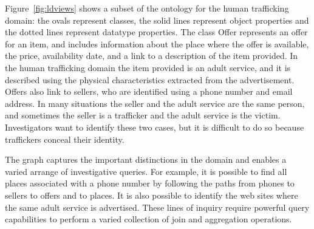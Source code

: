 Figure~\ref{fig:ldviews} shows a subset of the ontology for the human trafficking domain: the ovals represent classes, the solid lines represent object properties and the dotted lines represent datatype properties.
The class Offer represents an offer for an item, and includes information about the place where the offer is available, the price, availability date, and a link to a description of the item provided.
In the human trafficking domain the item provided is an adult service, and it is described using the physical characteristics extracted from the advertisement. 
Offers also link to sellers, who are identified using a phone number and email address.
In many situations the seller and the adult service are the same person, and sometimes the seller is a trafficker and the adult service is the victim.
Investigators want to identify these two cases, but it is difficult to do so because traffickers conceal their identity.

The graph captures the important distinctions in the domain and enables a varied arrange of investigative queries.
For example, it is possible to find all places associated with a phone number by following the paths from phones to sellers to offers and to places.
It is also possible to identify the web sites where the same adult service is advertised.
These lines of inquiry require powerful query capabilities to perform a varied collection of join and aggregation operations.